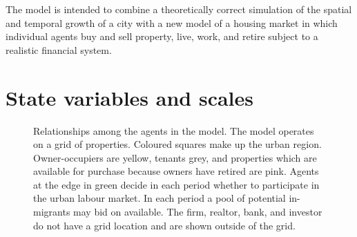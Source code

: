 The model  is intended to combine a theoretically correct simulation of the spatial and temporal growth of a city with a new model of a housing market in which individual agents buy and sell property, live, work, and retire subject to a realistic financial system. 



\section{State variables and scales}

\begin{figure}[h!tb] 
    \centering
        \resizebox{.95\textwidth}{!}{}
     \caption[Relationships among the agents in the model]{Relationships among the agents in the model. The model operates on a grid of properties. Coloured squares make up the urban region. Owner-occupiers are yellow, tenants grey, and properties which are available for purchase because owners have retired are pink.  Agents at the edge in green decide in each period whether to participate in the urban labour market. In each period a pool of potential in-migrants may bid on available. The firm, realtor, bank, and investor do not have a grid location and are shown outside of the grid.}
\label{fig:Kirsten_oerview_figure}
\end{figure}

%         

